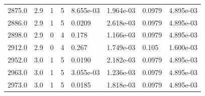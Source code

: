 \documentclass[preview]{standalone}
\begin{document}
{{{{\begin{tabular}{L{1.2cm}C{1.2cm} C{0.3cm}C{0.5cm} C{1.4cm}C{1.4cm} C{1.4cm}C{1.4cm}}
  2875.0  &   2.9  & 1     &  5 &  8.655e-03  & 1.964e-03  & 0.0979 &  4.895e-03   \\ 
  2886.0  &   2.9  & 1     &  5 &  0.0209  & 2.618e-03  & 0.0979 &  4.895e-03   \\ 
  2898.0  &   2.9  & 0     &  4 &  0.178  & 1.166e-03  & 0.0979 &  4.895e-03   \\ 
  2912.0  &   2.9  & 0     &  4 &  0.267  & 1.749e-03  & 0.105 &  1.600e-03   \\ 
  2952.0  &   3.0  & 1     &  5 &  0.0190  & 2.182e-03  & 0.0979 &  4.895e-03   \\ 
  2963.0  &   3.0  & 1     &  5 &  3.055e-03  & 1.236e-03  & 0.0979 &  4.895e-03   \\ 
  2973.0  &   3.0  & 1     &  5 &  0.0185  & 1.818e-03  & 0.0979 &  4.895e-03   \\ 
\hline 
\end{tabular} 

}}}}
\end{document}
